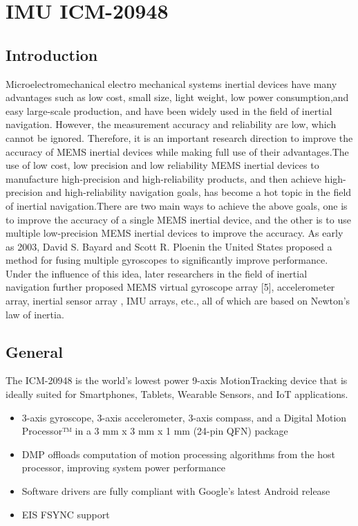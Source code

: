 %
%



\chapter{IMU ICM-20948}

\section{Introduction}

Microelectromechanical electro mechanical systems  inertial devices have many advantages such as low cost, small size, light weight, low power consumption,and easy large-scale production, and have been widely used in the field of inertial navigation. However, the measurement accuracy and reliability are low, which cannot be ignored. Therefore, it is an important research direction to improve the accuracy of MEMS inertial devices while making full use of their advantages.The use of low cost, low precision and low reliability MEMS inertial devices to manufacture high-precision and high-reliability products, and then achieve high-precision and high-reliability navigation goals, has become a hot topic in the field of inertial navigation.There are two main ways to achieve the above goals, one is to improve the accuracy of a single MEMS inertial device, and the other is to use multiple low-precision MEMS inertial devices to improve the accuracy. As early as 2003, David S. Bayard and Scott R. Ploenin the United States proposed a method for fusing multiple gyroscopes to significantly improve performance.\cite{Treichler:2005} Under the influence of this idea, later researchers in the field of inertial navigation further proposed MEMS virtual gyroscope array [5], accelerometer array, inertial sensor array \cite{Zhu:2014}, IMU arrays, etc., all of which are based on Newton’s law of inertia.\cite{Xuan:2024}

\section{General}

The ICM-20948 is the world’s lowest power 9-axis MotionTracking device that is ideally suited for Smartphones, Tablets, Wearable Sensors, and IoT applications.\cite{TDK:2024}

\begin{itemize}
	\item  3-axis gyroscope, 3-axis accelerometer, 3-axis
	compass, and a Digital Motion Processor™ 
	in a 3 mm x 3 mm x 1 mm (24-pin QFN) package
	\item DMP offloads computation of motion processing
	algorithms from the host processor, improving
	system power performance
	\item Software drivers are fully compliant with Google’s
	latest Android release
	\item EIS FSYNC support
\end{itemize}


